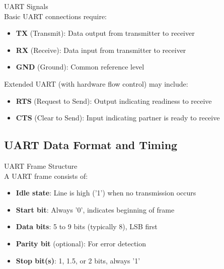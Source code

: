 \begin{definition}{UART Signals}\\
Basic UART connections require:
\begin{itemize}
    \item \textbf{TX} (Transmit): Data output from transmitter to receiver
    \item \textbf{RX} (Receive): Data input from transmitter to receiver
    \item \textbf{GND} (Ground): Common reference level
\end{itemize}
Extended UART (with hardware flow control) may include:
\begin{itemize}
    \item \textbf{RTS} (Request to Send): Output indicating readiness to receive
    \item \textbf{CTS} (Clear to Send): Input indicating partner is ready to receive
\end{itemize}
\end{definition}

\subsection{UART Data Format and Timing}

\begin{definition}{UART Frame Structure}\\
A UART frame consists of:
\begin{itemize}
    \item \textbf{Idle state}: Line is high ('1') when no transmission occurs
    \item \textbf{Start bit}: Always '0', indicates beginning of frame
    \item \textbf{Data bits}: 5 to 9 bits (typically 8), LSB first
    \item \textbf{Parity bit} (optional): For error detection
    \item \textbf{Stop bit(s)}: 1, 1.5, or 2 bits, always '1'
\end{itemize}
\end{definition}

